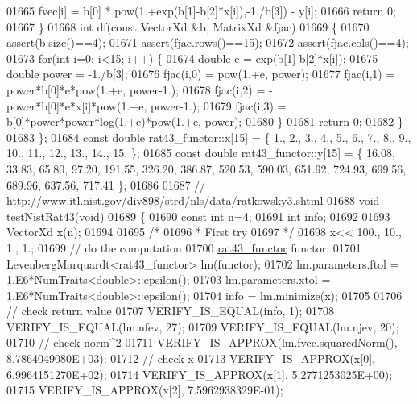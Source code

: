 \begin{DoxyCode}
01665             fvec[i] = b[0] * pow(1.+exp(b[1]-b[2]*x[i]),-1./b[3]) - y[i];
01666         \textcolor{keywordflow}{return} 0;
01667     \}
01668     \textcolor{keywordtype}{int} df(\textcolor{keyword}{const} VectorXd &b, MatrixXd &fjac)
01669     \{
01670         assert(b.size()==4);
01671         assert(fjac.rows()==15);
01672         assert(fjac.cols()==4);
01673         \textcolor{keywordflow}{for}(\textcolor{keywordtype}{int} i=0; i<15; i++) \{
01674             \textcolor{keywordtype}{double} e = exp(b[1]-b[2]*x[i]);
01675             \textcolor{keywordtype}{double} power = -1./b[3];
01676             fjac(i,0) = pow(1.+e, power);
01677             fjac(i,1) = power*b[0]*e*pow(1.+e, power-1.);
01678             fjac(i,2) = -power*b[0]*e*x[i]*pow(1.+e, power-1.);
01679             fjac(i,3) = b[0]*power*power*\hyperlink{structlog}{log}(1.+e)*pow(1.+e, power);
01680         \}
01681         \textcolor{keywordflow}{return} 0;
01682     \}
01683 \};
01684 \textcolor{keyword}{const} \textcolor{keywordtype}{double} rat43\_functor::x[15] = \{ 1., 2., 3., 4., 5., 6., 7., 8., 9., 10., 11., 12., 13., 14., 15. \};
01685 \textcolor{keyword}{const} \textcolor{keywordtype}{double} rat43\_functor::y[15] = \{ 16.08, 33.83, 65.80, 97.20, 191.55, 326.20, 386.87, 520.53, 590.03, 
      651.92, 724.93, 699.56, 689.96, 637.56, 717.41 \};
01686 
01687 \textcolor{comment}{// http://www.itl.nist.gov/div898/strd/nls/data/ratkowsky3.shtml}
01688 \textcolor{keywordtype}{void} testNistRat43(\textcolor{keywordtype}{void})
01689 \{
01690   \textcolor{keyword}{const} \textcolor{keywordtype}{int} n=4;
01691   \textcolor{keywordtype}{int} info;
01692 
01693   VectorXd x(n);
01694 
01695   \textcolor{comment}{/*}
01696 \textcolor{comment}{   * First try}
01697 \textcolor{comment}{   */}
01698   x<< 100., 10., 1., 1.;
01699   \textcolor{comment}{// do the computation}
01700   \hyperlink{structrat43__functor}{rat43\_functor} functor;
01701   LevenbergMarquardt<rat43\_functor> lm(functor);
01702   lm.parameters.ftol = 1.E6*NumTraits<double>::epsilon();
01703   lm.parameters.xtol = 1.E6*NumTraits<double>::epsilon();
01704   info = lm.minimize(x);
01705 
01706   \textcolor{comment}{// check return value}
01707   VERIFY\_IS\_EQUAL(info, 1);
01708   VERIFY\_IS\_EQUAL(lm.nfev, 27);
01709   VERIFY\_IS\_EQUAL(lm.njev, 20);
01710   \textcolor{comment}{// check norm^2}
01711   VERIFY\_IS\_APPROX(lm.fvec.squaredNorm(), 8.7864049080E+03);
01712   \textcolor{comment}{// check x}
01713   VERIFY\_IS\_APPROX(x[0], 6.9964151270E+02);
01714   VERIFY\_IS\_APPROX(x[1], 5.2771253025E+00);
01715   VERIFY\_IS\_APPROX(x[2], 7.5962938329E-01);

\end{DoxyCode}
